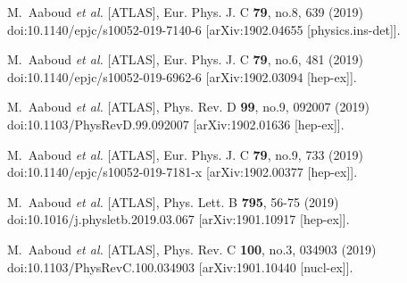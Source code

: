 \begin{thebibliography}{9}
M.~Aaboud \textit{et al.} [ATLAS],
Eur. Phys. J. C \textbf{79}, no.8, 639 (2019)
doi:10.1140/epjc/s10052-019-7140-6
[arXiv:1902.04655 [physics.ins-det]].

M.~Aaboud \textit{et al.} [ATLAS],
Eur. Phys. J. C \textbf{79}, no.6, 481 (2019)
doi:10.1140/epjc/s10052-019-6962-6
[arXiv:1902.03094 [hep-ex]].

M.~Aaboud \textit{et al.} [ATLAS],
Phys. Rev. D \textbf{99}, no.9, 092007 (2019)
doi:10.1103/PhysRevD.99.092007
[arXiv:1902.01636 [hep-ex]].

M.~Aaboud \textit{et al.} [ATLAS],
Eur. Phys. J. C \textbf{79}, no.9, 733 (2019)
doi:10.1140/epjc/s10052-019-7181-x
[arXiv:1902.00377 [hep-ex]].

M.~Aaboud \textit{et al.} [ATLAS],
Phys. Lett. B \textbf{795}, 56-75 (2019)
doi:10.1016/j.physletb.2019.03.067
[arXiv:1901.10917 [hep-ex]].

M.~Aaboud \textit{et al.} [ATLAS],
Phys. Rev. C \textbf{100}, no.3, 034903 (2019)
doi:10.1103/PhysRevC.100.034903
[arXiv:1901.10440 [nucl-ex]].


\end{thebibliography}
